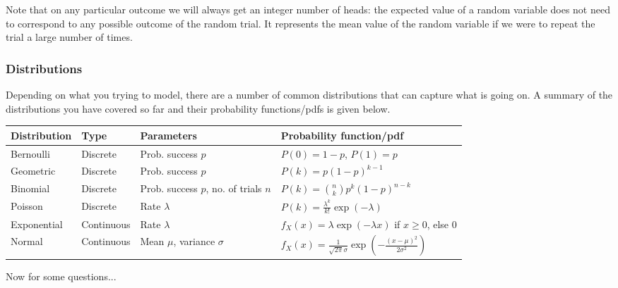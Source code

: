 Note that on any particular outcome we will always get an integer number of
heads: the expected value of a random variable does not need to correspond to
any possible outcome of the random trial. It represents the mean value of the
random variable if we were to repeat the trial a large number of times.

\subsubsection*{Distributions}
Depending on what you trying to model, there are a number of common distributions that can capture what is going on. A summary of the distributions you have covered so far and their probability functions/pdfs is given below.

\begin{center}
    \begin{tabular}{|p{2.5cm} | p{2cm}| p{5cm} | p{5cm}|}
    \hline
    {\bf Distribution} & {\bf Type} & {\bf Parameters} & {\bf Probability function/pdf} \\ \hline
    Bernoulli & Discrete & Prob. success $p$ & $P(0)=1-p$, $P(1)=p$ \\ \hline
    Geometric & Discrete & Prob. success $p$ & $P(k)=p(1-p)^{k-1}$ \\ \hline
    Binomial & Discrete & Prob. success $p$, no. of trials $n$ & $P(k)=\binom{n}{k} p^{k} (1-p)^{n-k}$ \\ \hline
    Poisson & Discrete & Rate $\lambda$ & $P(k)=\frac{\lambda^{k}}{k!}\exp(-\lambda)$ \\ \hline
    Exponential & Continuous & Rate $\lambda$ & $f_{X}(x)=\lambda\exp (-\lambda x)$ if $x\geq 0$, else 0 \\ \hline
    Normal & Continuous & Mean $\mu$, variance $\sigma$ & $f_{X}(x)=\frac{1}{\sqrt{2 \pi} \sigma}\exp \left( - \frac{(x-\mu)^{2}}{2 \sigma^{2}} \right)$ \\
    \hline
    \end{tabular}
\end{center}

Now for some questions...\\
